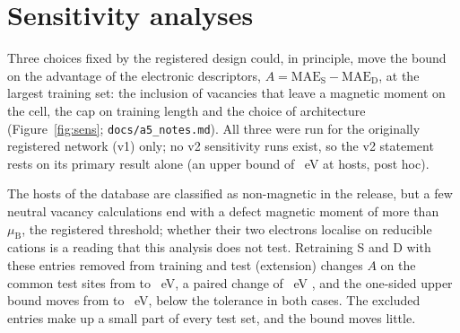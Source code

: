 \section{Sensitivity analyses}
\label{si:sensitivities}

Three choices fixed by the registered design could, in principle, move the bound on the advantage of the electronic
descriptors, $A = \mathrm{MAE}_\mathrm{S} - \mathrm{MAE}_\mathrm{D}$, at the largest training set: the inclusion of
vacancies that leave a magnetic moment on the cell, the cap on training length and the choice of architecture
(Figure~\ref{fig:sens}; \texttt{docs/a5\_notes.md}). All three were run for the originally registered network
(v1) only; no v2 sensitivity runs exist, so the v2 statement rests on its primary result alone (an upper bound of
\numSensCappedPostHocVTwoPrimarySixHundredFiftyFourPrimaryAUpperOneSided{}~eV at \numCfgBudgetsHostsItemSix{}
hosts, post hoc).

The hosts of the database are classified as non-magnetic in the release, but a few neutral vacancy calculations end with a defect magnetic
moment of more than \numSensHighMomentVOneThresholdMuB{}~$\mu_\mathrm{B}$, the registered threshold; whether their
two electrons localise on reducible cations is a reading that this analysis does not test. Retraining S
and D with these entries removed from training and test (extension) changes $A$ on the common test sites from
\numSensHighMomentVOnePrimaryCommonSitesAMean{} to \numSensHighMomentVOneHighMomentAMean{}~eV, a paired change of
\numSensHighMomentVOneChangeHighMomentMinusPrimaryAMean{}~eV
\ci{\numSensHighMomentVOneChangeHighMomentMinusPrimaryACiLo{}}{\numSensHighMomentVOneChangeHighMomentMinusPrimaryACiHi{}},
and the one-sided upper bound moves from \numSensHighMomentVOnePrimaryCommonSitesAUpperOneSided{} to
\numSensHighMomentVOneHighMomentAUpperOneSided{}~eV, below the tolerance in both cases. The excluded entries make up a small part of every test set, and the bound
moves little.

